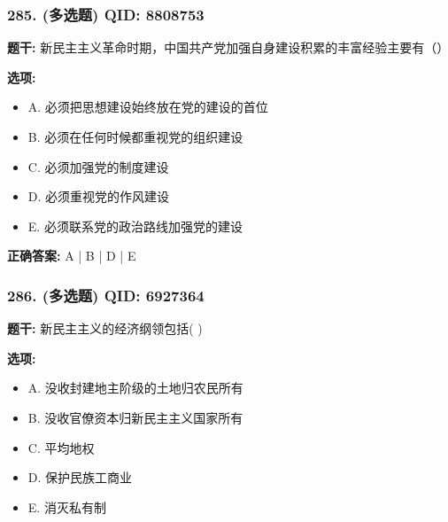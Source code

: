 \documentclass[12pt,UTF8]{ctexart}
\begin{document}
\vspace{0.3em}\hrulefill\vspace{0.7em}

\subsubsection*{285. (多选题) \small QID: 8808753}

\textbf{题干:}
新民主主义革命时期，中国共产党加强自身建设积累的丰富经验主要有（）

\textbf{选项:}
\begin{itemize}[leftmargin=*]

  \item A. 必须把思想建设始终放在党的建设的首位

  \item B. 必须在任何时候都重视党的组织建设

  \item C. 必须加强党的制度建设

  \item D. 必须重视党的作风建设

  \item E. 必须联系党的政治路线加强党的建设

\end{itemize}

\textbf{正确答案:}
A | B | D | E

\vspace{0.3em}\hrulefill\vspace{0.7em}

\subsubsection*{286. (多选题) \small QID: 6927364}

\textbf{题干:}
新民主主义的经济纲领包括(   )

\textbf{选项:}
\begin{itemize}[leftmargin=*]

  \item A. 没收封建地主阶级的土地归农民所有

  \item B. 没收官僚资本归新民主主义国家所有

  \item C. 平均地权

  \item D. 保护民族工商业

  \item E. 消灭私有制

\end{itemize}
\end{document}
